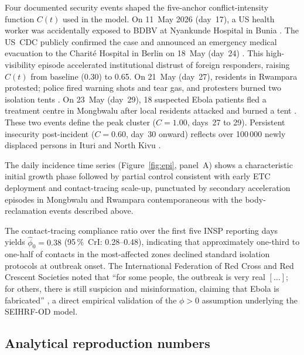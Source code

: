 \documentclass[12pt,a4paper]{article}
\begin{document}
Four documented security events shaped the five-anchor conflict-intensity
function $C(t)$ used in the model. On 11~May 2026 (day~17), a US health
worker was accidentally exposed to BDBV at Nyankunde Hospital in Bunia
\citep{CDC2026,Guardian2026}. The US~CDC publicly confirmed the case and
announced an emergency medical evacuation to the Charit\'{e} Hospital in
Berlin on 18~May (day~24) \citep{CDC2026}. This high-visibility episode
accelerated institutional distrust of foreign responders, raising $C(t)$
from baseline (0.30) to 0.65. On 21~May (day~27), residents in Rwampara
protested; police fired warning shots and tear gas, and protesters burned
two isolation tents \citep{LeDevoir2026}. On 23~May (day~29), 18 suspected
Ebola patients fled a treatment centre in Mongbwalu after local residents
attacked and burned a tent \citep{WHODON603,AlJazeera2026}. These two events
define the peak cluster ($C = 1.00$, days~27 to 29). Persistent insecurity
post-incident ($C = 0.60$, day~30 onward) reflects over 100\,000 newly
displaced persons in Ituri and North Kivu \citep{WHODON603}.

The daily incidence time series (Figure~\ref{fig:epi}, panel~A) shows a
characteristic initial growth phase followed by partial control consistent
with early ETC deployment and contact-tracing scale-up, punctuated by
secondary acceleration episodes in Mongbwalu and Rwampara contemporaneous
with the body-reclamation events described above.

The contact-tracing compliance ratio over the first five INSP reporting days
yields $\hat\phi_0 = 0.38$ (95\,\%~CrI: 0.28--0.48), indicating that
approximately one-third to one-half of contacts in the most-affected zones
declined standard isolation protocols at outbreak onset. The International
Federation of Red Cross and Red Crescent Societies noted that ``for some
people, the outbreak is very real $[\ldots]$; for others, there is still
suspicion and misinformation, claiming that Ebola is fabricated''
\citep{NPR2026}, a direct empirical validation of the $\phi > 0$ assumption
underlying the SEIHRF-OD model.

\subsection{Analytical reproduction numbers}
\end{document}
